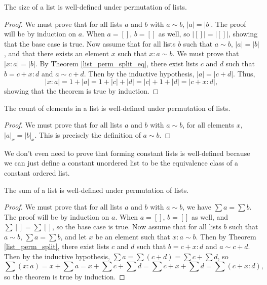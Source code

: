 \documentclass[../../math.tex]{subfiles}
\begin{document}
\begin{lemma}
    The size of a list is well-defined under permutation of lists.
\end{lemma}
\begin{proof}
    We must prove that for all lists $a$ and $b$ with $a \sim b$, $|a| = |b|$.
    The proof will be by induction on $a$.  When $a = []$, $b = []$ as well, so
    $|[]| = |[]|$, showing that the base case is true.  Now assume that for all
    lists $b$ such that $a \sim b$, $|a| = |b|$, and that there exists an
    element $x$ such that $x : a \sim b$.  We must prove that $|x : a| = |b|$.
    By Theorem \ref{list_perm_split_eq}, there exist lists $c$ and $d$ such that
    $b = c + x : d$ and $a \sim c + d$.  Then by the inductive hypothesis, $|a|
    = |c + d|$.  Thus,
    \[
        |x : a| = 1 + |a| = 1 + |c| + |d| = |c| + 1 + |d| = |c + x : d|,
    \]
    showing that the theorem is true by induction.
\end{proof}

\begin{lemma}
    The count of elements in a list is well-defined under permutation of lists.
\end{lemma}
\begin{proof}
    We must prove that for all lists $a$ and $b$ with $a \sim b$, for all
    elements $x$, $|a|_x = |b|_x$.  This is precisely the definition of $a \sim
    b$.
\end{proof}

We don't even need to prove that forming constant lists is well-defined because
we can just define a constant unordered list to be the equivalence class of a
constant ordered list.

\begin{lemma}
    The sum of a list is well-defined under permutation of lists.
\end{lemma}
\begin{proof}
    We must prove that for all lists $a$ and $b$ with $a \sim b$, we have $\sum
    a = \sum b$.  The proof will be by induction on $a$.  When $a = []$, $b =
    []$ as well, and $\sum [] = \sum []$, so the base case is true.  Now assume
    that for all lists $b$ such that $a \sim b$, $\sum a = \sum b$, and let $x$
    be an element such that $x : a \sim b$.  Then by Theorem
    \ref{list_perm_split}, there exist lists $c$ and $d$ such that $b = c + x :
    d$ and $a \sim c + d$.  Then by the inductive hypothesis, $\sum a = \sum (c
    + d) = \sum c + \sum d$, so
    \[
        \sum (x : a) = x + \sum a = x + \sum c + \sum d = \sum c + x + \sum d
        = \sum (c + x : d),
    \]
    so the theorem is true by induction.
\end{proof}
\end{document}
